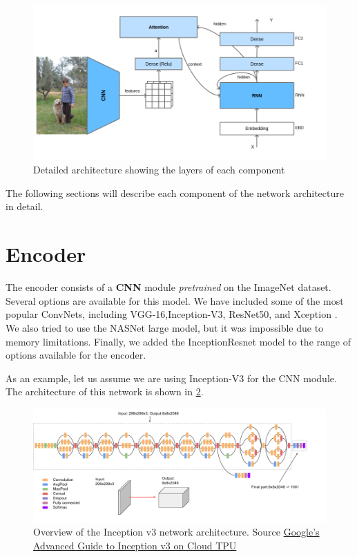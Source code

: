 \begin{figure}[hpt]
    \centering
    \includegraphics[scale=0.5]{images/ch4/overall-architecture.png}
    \caption{Detailed architecture showing the layers of each component}
    \label{fig:overall-architecture}
\end{figure}


The following sections will describe each component of the network architecture in detail.

\section{Encoder}\label{sec:encoder}

The encoder consists of a \textbf{CNN} module \textit{pretrained} on the ImageNet dataset. Several options are available for this model. We have included some of the most popular ConvNets, including VGG-16\citep{Simonyan2015},Inception-V3\citep{Szegedy2016}, ResNet50\citep{He2016resnet}, and Xception \citep{Chollet2017}. We also tried to use the NASNet \citep{Zoph2018} large model, but it was impossible due to memory limitations. Finally, we added the InceptionResnet \citet{Szegedy2016} model to the range of options available for the encoder.

As an example, let us assume we are using Inception-V3 for the CNN module. The architecture of this network is shown in \cref{fig:inceptionv3}.

\begin{figure}[hpt]
    \centering
    \includegraphics[scale=0.5]{images/ch4/inceptionv3.png}
    \caption{Overview of the Inception v3 network architecture. Source \href{https://cloud.google.com/tpu/docs/inception-v3-advanced}{Google's Advanced Guide to Inception v3 on Cloud TPU}}
    \label{fig:inceptionv3}
\end{figure}

